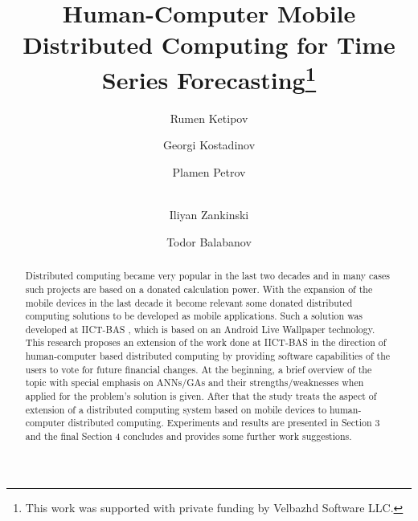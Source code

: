 \documentclass[runningheads]{llncs}
\begin{document}
\title{Human-Computer Mobile Distributed Computing for Time Series Forecasting\thanks{This work was supported with private funding by Velbazhd Software LLC.}}

\author{
	Rumen Ketipov \and
	Georgi Kostadinov \and
	Plamen Petrov \and \\
	Iliyan Zankinski \and
	Todor Balabanov
}



\maketitle

\begin{abstract}
Distributed computing became very popular in the last two decades and in many cases such projects are based on a donated calculation power. With the expansion of the mobile devices in the last decade it become relevant some donated distributed computing solutions to be developed as mobile applications. Such a solution was developed at IICT-BAS \cite{tomov01}, which is based on an Android Live Wallpaper technology. This research proposes an extension of the work done at IICT-BAS in the direction of human-computer based distributed computing by providing software capabilities of the users to vote for future financial changes.
At the beginning, a brief overview of the topic with special emphasis on ANNs/GAs and their strengths/weaknesses when applied for the problem's solution is given. After that the study treats the aspect of extension of a distributed computing system based on mobile devices to human-computer distributed computing. Experiments and results are presented in Section 3 and the final Section 4 concludes and provides some further work suggestions.

\end{abstract}
\end{document}
